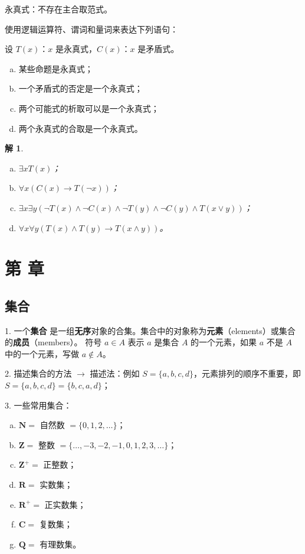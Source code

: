 \documentclass[normal,cyan]{elegantnote}
\newcommand{\roma}[1]{\uppercase\expandafter{\romannumeral#1}}
\newtheorem{solve}{解}
\begin{document}
永真式：不存在主合取范式。
\begin{example}
    使用逻辑运算符、谓词和量词来表达下列语句：

    设 $T(x)$：$x$ 是永真式，$C(x)$：$x$ 是矛盾式。

    \begin{enumerate}[a)]
        \item 某些命题是永真式；
        \item 一个矛盾式的否定是一个永真式；
        \item 两个可能式的析取可以是一个永真式；
        \item 两个永真式的合取是一个永真式。
    \end{enumerate}
\end{example}
\begin{solve}
    \begin{enumerate}[a)]
        \item $\exists xT(x)$；
        \item $\forall x(C(x) \to T(\neg x))$；
        \item $\exists x \exists y(\neg T(x) \wedge \neg C(x) \wedge \neg T(y) \wedge \neg C(y) \wedge T(x \vee y))$；
        \item $\forall x \forall y(T(x) \wedge T(y) \to T(x \wedge y))$。
    \end{enumerate}
\end{solve}
\newpage
\section{第 \roma{2} 章}
\subsection{集合}

1. 一个\textbf{集合} 是一组\textbf{无序}对象的合集。集合中的对象称为\textbf{元素}（elements）或集合的\textbf{成员}（members）。
符号 $a \in A$ 表示 $a$ 是集合 $A$ 的一个元素，如果 $a$ 不是 $A$ 中的一个元素，写做 $a \notin A$。

2. 描述集合的方法 $\rightarrow$ 描述法：例如 $S = \{a, b, c, d\}$，元素排列的顺序不重要，即 $S = \{a, b, c, d\} = \{b, c, a, d\}$；

3. 一些常用集合：
\begin{enumerate}[a)]
    \item $\mathbf{N} = $ 自然数 $= \{0, 1, 2, \dots\}$；
    \item $\mathbf{Z} = $ 整数 $= \{\dots, -3, -2, -1, 0, 1, 2, 3,\dots\}$；
    \item $\mathbf{Z^+} = $ 正整数；
    \item $\mathbf{R} = $ 实数集；
    \item $\mathbf{R^+} = $ 正实数集；
    \item $\mathbf{C} = $ 复数集；
    \item $\mathbf{Q} = $ 有理数集。
\end{enumerate}
\end{document}
